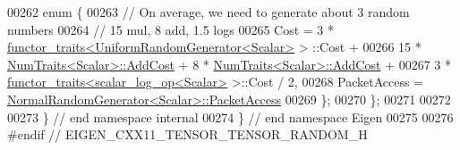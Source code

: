 \begin{DoxyCode}
00262   \textcolor{keyword}{enum} \{
00263     \textcolor{comment}{// On average, we need to generate about 3 random numbers}
00264     \textcolor{comment}{// 15 mul, 8 add, 1.5 logs}
00265     Cost = 3 * \hyperlink{struct_eigen_1_1internal_1_1functor__traits}{functor\_traits<UniformRandomGenerator<Scalar>} >
      ::Cost +
00266            15 * \hyperlink{group___core___module_struct_eigen_1_1_num_traits}{NumTraits<Scalar>::AddCost} + 8 * 
      \hyperlink{group___core___module_struct_eigen_1_1_num_traits}{NumTraits<Scalar>::AddCost} +
00267            3 * \hyperlink{struct_eigen_1_1internal_1_1functor__traits}{functor\_traits<scalar\_log\_op<Scalar>} >::Cost / 2,
00268     PacketAccess = \hyperlink{class_eigen_1_1internal_1_1_normal_random_generator}{NormalRandomGenerator<Scalar>::PacketAccess}
00269   \};
00270 \};
00271 
00272 
00273 \} \textcolor{comment}{// end namespace internal}
00274 \} \textcolor{comment}{// end namespace Eigen}
00275 
00276 \textcolor{preprocessor}{#endif // EIGEN\_CXX11\_TENSOR\_TENSOR\_RANDOM\_H}
\end{DoxyCode}
